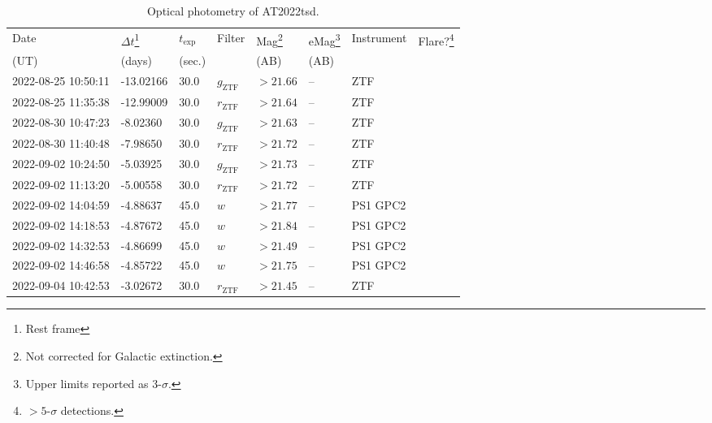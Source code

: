 \documentclass{nature_plusfigure}
\begin{document}
\clearpage

\begin{supplement}

\renewcommand{\thefigure}{Supplementary Information Figure~\arabic{figure}}
\renewcommand{\figurename}{}
\setcounter{figure}{0}
%


\renewcommand{\thetable}{Supplementary Information Table~\arabic{table}}
 \renewcommand{\tablename}{}
\setcounter{table}{0}

\begin{center} 
\begin{longtable}{llllllll} 
\caption{Optical photometry of AT2022tsd.} 
\label{tab:optical-photometry}\\ 
\hline\hline
Date & $\Delta t$\footnote{Rest frame} & $t_\mathrm{exp}$ & Filter & Mag\footnote{Not corrected for Galactic extinction.} & eMag\footnote{Upper limits reported as 3-$\sigma$.} & Instrument & Flare?\footnote{$>5$-$\sigma$ detections.}\\ 
(UT) & (days) & (sec.) &  & (AB) & (AB) &  & \\ 
\hline
2022-08-25 10:50:11 & -13.02166 & 30.0 & ${g}_\mathrm{ZTF}$ & $>21.66$ & -- & ZTF &  \\ 
2022-08-25 11:35:38 & -12.99009 & 30.0 & ${r}_\mathrm{ZTF}$ & $>21.64$ & -- & ZTF &  \\ 
2022-08-30 10:47:23 & -8.02360 & 30.0 & ${g}_\mathrm{ZTF}$ & $>21.63$ & -- & ZTF &  \\ 
2022-08-30 11:40:48 & -7.98650 & 30.0 & ${r}_\mathrm{ZTF}$ & $>21.72$ & -- & ZTF &  \\ 
2022-09-02 10:24:50 & -5.03925 & 30.0 & ${g}_\mathrm{ZTF}$ & $>21.73$ & -- & ZTF &  \\ 
2022-09-02 11:13:20 & -5.00558 & 30.0 & ${r}_\mathrm{ZTF}$ & $>21.72$ & -- & ZTF &  \\ 
2022-09-02 14:04:59 & -4.88637 & 45.0 & $w$ & $>21.77$ & -- & PS1 GPC2 &  \\ 
2022-09-02 14:18:53 & -4.87672 & 45.0 & $w$ & $>21.84$ & -- & PS1 GPC2 &  \\ 
2022-09-02 14:32:53 & -4.86699 & 45.0 & $w$ & $>21.49$ & -- & PS1 GPC2 &  \\ 
2022-09-02 14:46:58 & -4.85722 & 45.0 & $w$ & $>21.75$ & -- & PS1 GPC2 &  \\ 
2022-09-04 10:42:53 & -3.02672 & 30.0 & ${r}_\mathrm{ZTF}$ & $>21.45$ & -- & ZTF &  \\ 

\end{longtable}
\end{center}
\end{supplement}
\end{document}
